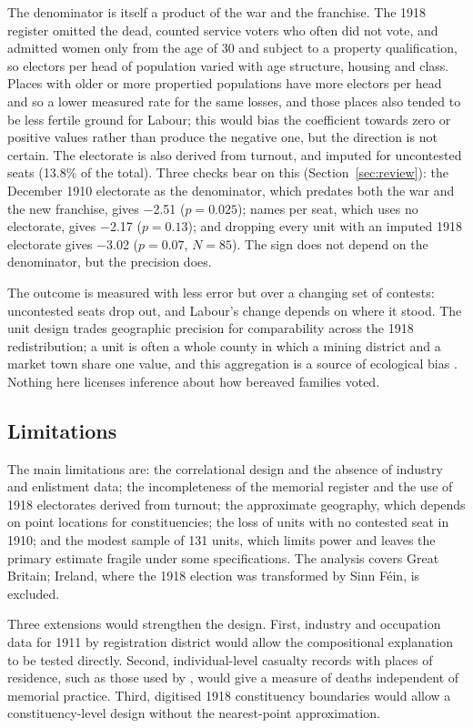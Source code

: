 \documentclass[11pt,a4paper]{article}
\begin{document}
The denominator is itself a product of the war and the franchise. The 1918 register omitted the dead, counted service voters who often did not vote, and admitted women only from the age of 30 and subject to a property qualification, so electors per head of population varied with age structure, housing and class. Places with older or more propertied populations have more electors per head and so a lower measured rate for the same losses, and those places also tended to be less fertile ground for Labour; this would bias the coefficient towards zero or positive values rather than produce the negative one, but the direction is not certain. The electorate is also derived from turnout, and imputed for uncontested seats (13.8\% of the total). Three checks bear on this (Section~\ref{sec:review}): the December 1910 electorate as the denominator, which predates both the war and the new franchise, gives $-$2.51 ($p=0.025$); names per seat, which uses no electorate, gives $-$2.17 ($p=0.13$); and dropping every unit with an imputed 1918 electorate gives $-$3.02 ($p=0.07$, $N=85$). The sign does not depend on the denominator, but the precision does.

The outcome is measured with less error but over a changing set of contests: uncontested seats drop out, and Labour's change depends on where it stood. The unit design trades geographic precision for comparability across the 1918 redistribution; a unit is often a whole county in which a mining district and a market town share one value, and this aggregation is a source of ecological bias \citep{robinson1950,king1997}. Nothing here licenses inference about how bereaved families voted.

\subsection{Limitations}
The main limitations are: the correlational design and the absence of industry and enlistment data; the incompleteness of the memorial register and the use of 1918 electorates derived from turnout; the approximate geography, which depends on point locations for constituencies; the loss of units with no contested seat in 1910; and the modest sample of 131 units, which limits power and leaves the primary estimate fragile under some specifications. The analysis covers Great Britain; Ireland, where the 1918 election was transformed by Sinn F\'ein, is excluded.

Three extensions would strengthen the design. First, industry and occupation data for 1911 by registration district would allow the compositional explanation to be tested directly. Second, individual-level casualty records with places of residence, such as those used by \citet{carozzi2023}, would give a measure of deaths independent of memorial practice. Third, digitised 1918 constituency boundaries would allow a constituency-level design without the nearest-point approximation.
\end{document}
